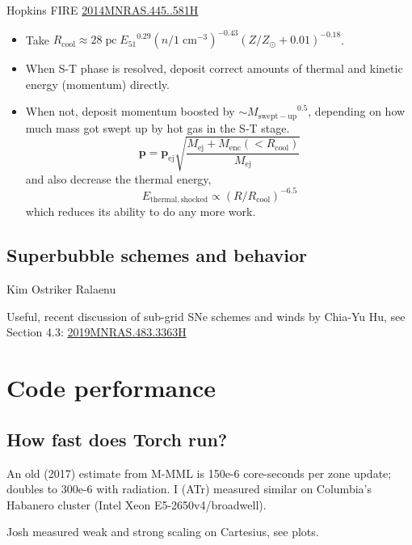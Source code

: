 \documentclass[10pt]{article}
\newcommand*{\mt}{\mathrm}
\newcommand*{\unit}[1]{\;\mt{#1}}  %
\newcommand*{\abt}{\mathord{\sim}} %
\renewcommand{\vec}[1]{\boldsymbol{#1}}  %
\newcommand*{\sun}{\odot}
\begin{document}
Hopkins FIRE
\href{https://ui.adsabs.harvard.edu/abs/2014MNRAS.445..581H/abstract}{2014MNRAS.445..581H}
\begin{itemize}
    \item Take
        $R_\mt{cool} \approx 28 \unit{pc} \; {E_{51}}^{0.29}
            \left(n / 1 \unit{cm^{-3}}\right)^{-0.43}
            \left(Z/Z_\sun + 0.01\right)^{-0.18}$.
    \item When S-T phase is resolved, deposit correct amounts of thermal
        and kinetic energy (momentum) directly.
    \item When not, deposit momentum boosted by $\abt {M_\mt{swept-up}}^{0.5}$,
        depending on how much mass got swept up by hot gas in the S-T stage.
\[
    \vec{p} = \vec{p}_\mt{ej} \sqrt{ \frac{M_\mt{ej} + M_\mt{enc}(<R_\mt{cool})}{M_\mt{ej}} }
\]
    and also decrease the thermal energy,
\[
    E_\mt{thermal,shocked} \propto \left(R/R_\mt{cool}\right)^{-6.5}
\]
    which reduces its ability to do any more work.
\end{itemize}

\subsection{Superbubble schemes and behavior}

Kim Ostriker Ralaenu

Useful, recent discussion of sub-grid SNe schemes and winds by Chia-Yu Hu, see
Section 4.3:
\href{https://ui.adsabs.harvard.edu/abs/2019MNRAS.483.3363H/abstract}{2019MNRAS.483.3363H}


\section{Code performance}


\subsection{How fast does Torch run?}

An old (2017) estimate from M-MML is 150e-6 core-seconds per zone update;
doubles to 300e-6 with radiation.  I (ATr) measured similar on Columbia's
Habanero cluster (Intel Xeon E5-2650v4/broadwell).

Josh measured weak and strong scaling on Cartesius, see plots.
\end{document}

